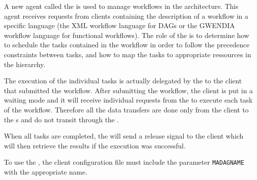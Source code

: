 A new agent called the \textit{\madag} is used to manage workflows
in the \diet architecture. This agent receives requests from clients
containing the description of a workflow in a specific language
(the \madag XML workflow language for DAGs or the GWENDIA workflow
language for functional workflows). The role of the \madag is to
determine how to schedule the tasks contained in the workflow in
order to follow the precedence constraints between tasks, and how to
map the tasks to appropriate ressources in the \diet hierarchy.

The execution of the individual tasks is actually delegated by the
\madag to the client that submitted the workflow. After submitting
the workflow, the client is put in a waiting mode and it will
receive individual requests from the \madag to execute each task
of the workflow. Therefore all the data transfers are done only
from the client to the {\sed}s and do not transit through the \madag.

When all tasks are completed, the \madag will send a release signal
to the client which will then retrieve the results if the execution
was successful.

To use the \madag, the client configuration file must include
the parameter \texttt{MADAGNAME} with the appropriate name.

